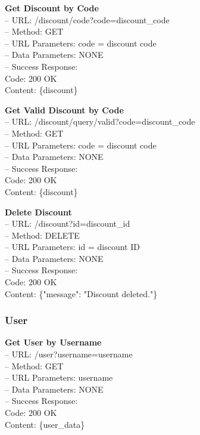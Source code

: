 \begin{flushleft} 
\textbf{Get Discount by Code} \\
– URL: /discount/code?code={discount\_code} \\
– Method: GET \\
– URL Parameters: code = discount code \\
– Data Parameters: NONE \\
– Success Response: \\
Code: 200 OK \\
Content: \{discount\}
\end{flushleft}

\begin{flushleft} 
\textbf{Get Valid Discount by Code} \\
– URL: /discount/query/valid?code={discount\_code} \\
– Method: GET \\
– URL Parameters: code = discount code \\
– Data Parameters: NONE \\
– Success Response: \\
Code: 200 OK \\
Content: \{discount\}
\end{flushleft}

\begin{flushleft} 
\textbf{Delete Discount} \\
– URL: /discount?id={discount\_id} \\
– Method: DELETE \\
– URL Parameters: id = discount ID \\
– Data Parameters: NONE \\
– Success Response: \\
Code: 200 OK \\
Content: \{"message": "Discount deleted."\}
\end{flushleft}

\subsubsection*{User}
\textbf{Get User by Username} \\
– URL: /user?username={username} \\
– Method: GET \\
– URL Parameters: username \\
– Data Parameters: NONE \\
– Success Response: \\
Code: 200 OK \\
Content: \{user\_data\}


